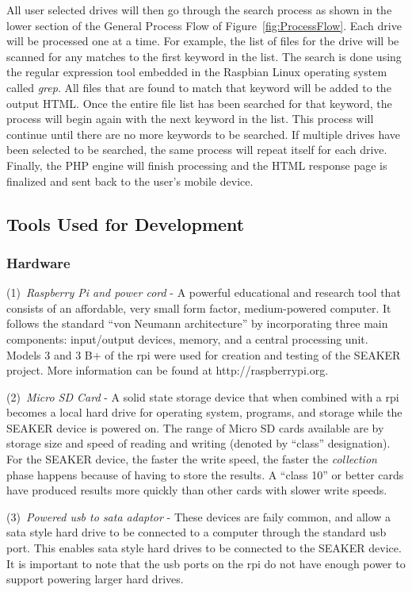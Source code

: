 \documentclass[12pt]{article}
\begin{document}
All user selected drives will then go through the search process as
shown in the lower section of the General Process Flow of
Figure~\ref{fig:ProcessFlow}. Each drive will be processed one at a
time. For example, the list of files for the drive will be scanned
for any matches to the first keyword in the list. The search is done
using the regular expression tool embedded in the Raspbian Linux
operating system called {\em grep}. All files that are found to match
that keyword will be added to the output HTML. Once the entire file
list has been searched for that keyword, the process will begin again
with the next keyword in the list. This process will continue until
there are no more keywords to be searched. If multiple drives have
been selected to be searched, the same process will repeat itself
for each drive. Finally, the PHP engine will finish processing and
the HTML response page is finalized and sent back to the user's
mobile device.


\subsection{Tools Used for Development}

\subsubsection{Hardware}

(1)~{\em Raspberry Pi and power cord} - A powerful educational and research
tool that consists of an affordable, very small form factor, medium-powered
computer.  It follows the standard ``von Neumann architecture'' by 
incorporating three main components: input/output devices, memory, and a 
central processing unit.  Models 3 and 3 B+ of the \gls{rpi} were used
for creation and testing of the SEAKER project. More information can be
found at http://raspberrypi.org.

(2)~{\em Micro SD Card} - A solid state storage device that when combined
with a \gls{rpi} becomes a local hard drive for operating system, programs,
and storage while the SEAKER device is powered on.  The range of Micro SD
cards available are by storage size and speed of reading and writing
(denoted by ``class'' designation).  For
the SEAKER device, the faster the write speed, the faster the
{\em collection} phase happens because of having to store the results.
A ``class 10'' or better cards have produced results more quickly than
other cards with slower write speeds.

(3)~{\em Powered \gls{usb} to \gls{sata} adaptor} - These devices are faily common, and
allow a \gls{sata} style hard drive to be connected to a computer through the
standard \gls{usb} port.  This enables \gls{sata} style hard drives to be connected
to the SEAKER device.  It is important to note that the \gls{usb} ports on the
\gls{rpi} do not have enough power to support powering larger hard
drives.
\end{document}

